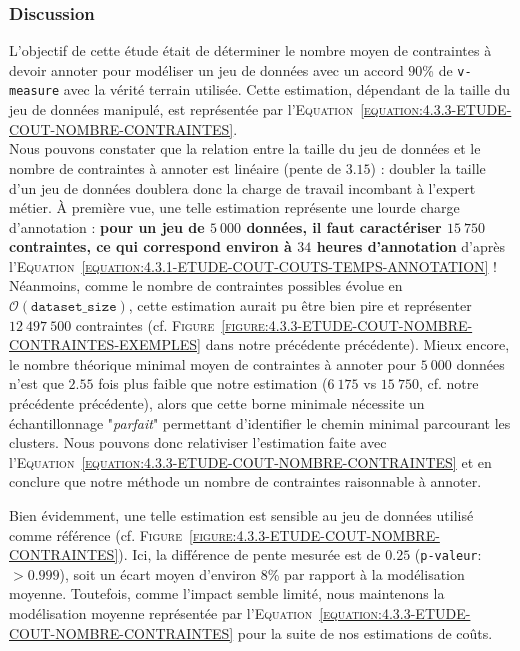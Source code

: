 		\subsubsection{Discussion}
		
			L'objectif de cette étude était de déterminer le nombre moyen de contraintes à devoir annoter pour modéliser un jeu de données avec un accord $90$\% de \texttt{v-measure} avec la vérité terrain utilisée.
			Cette estimation, dépendant de la taille du jeu de données manipulé, est représentée par l'\textsc{Equation~\ref{equation:4.3.3-ETUDE-COUT-NOMBRE-CONTRAINTES}}.
			\\
			
			Nous pouvons constater que la relation entre la taille du jeu de données et le nombre de contraintes à annoter est linéaire (pente de $3.15$) : doubler la taille d'un jeu de données doublera donc la charge de travail incombant à l'expert métier.
			À première vue, une telle estimation représente une lourde charge d'annotation : \textbf{pour un jeu de $5~000$ données, il faut caractériser $15~750$ contraintes, ce qui correspond environ à $34$ heures d'annotation} d'après l'\textsc{Equation~\ref{equation:4.3.1-ETUDE-COUT-COUTS-TEMPS-ANNOTATION}} !
			Néanmoins, comme le nombre de contraintes possibles évolue en $ \mathcal{O}(\texttt{dataset\_size}) $, cette estimation aurait pu être bien pire et représenter $12~497~500$ contraintes (cf. \textsc{Figure~\ref{figure:4.3.3-ETUDE-COUT-NOMBRE-CONTRAINTES-EXEMPLES}} dans notre précédente précédente).
			Mieux encore, le nombre théorique minimal moyen de contraintes à annoter pour $5~000$ données n'est que $2.55$ fois plus faible que notre estimation ($6~175$ vs $15~750$, cf. notre précédente précédente), alors que cette borne minimale nécessite un échantillonnage "\textit{parfait}" permettant d'identifier le chemin minimal parcourant les clusters.
			Nous pouvons donc relativiser l'estimation faite avec l'\textsc{Equation~\ref{equation:4.3.3-ETUDE-COUT-NOMBRE-CONTRAINTES}} et en conclure que notre méthode un nombre de contraintes raisonnable à annoter.
			
			Bien évidemment, une telle estimation est sensible au jeu de données utilisé comme référence (cf. \textsc{Figure~\ref{figure:4.3.3-ETUDE-COUT-NOMBRE-CONTRAINTES}}).
			Ici, la différence de pente mesurée est de $0.25$ (\texttt{p-valeur}: $> 0.999$), soit un écart moyen d'environ $8$\% par rapport à la modélisation moyenne.
			Toutefois, comme l'impact semble limité, nous maintenons la modélisation moyenne représentée par l'\textsc{Equation~\ref{equation:4.3.3-ETUDE-COUT-NOMBRE-CONTRAINTES}} pour la suite de nos estimations de coûts.
		
